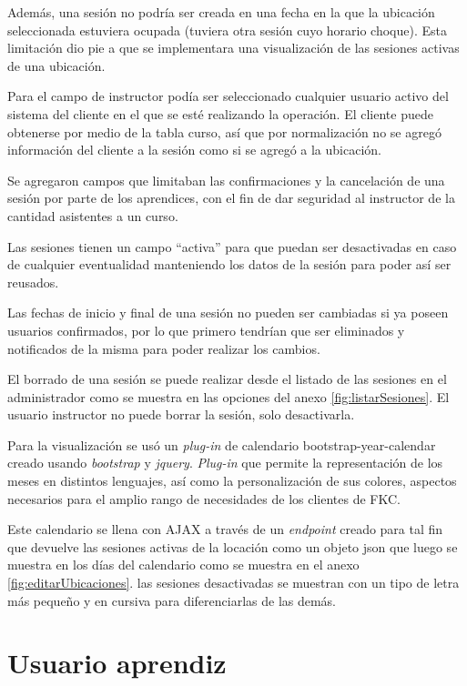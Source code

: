 	Además, una sesión no podría ser creada en una fecha en la que la ubicación seleccionada estuviera ocupada (tuviera otra sesión cuyo horario choque). Esta limitación dio pie a que se implementara una visualización de las sesiones activas de una ubicación.

	Para el campo de instructor podía ser seleccionado cualquier usuario activo del sistema del cliente en el que se esté realizando la operación. El cliente puede obtenerse por medio de la tabla curso, así que por normalización no se agregó información del cliente a la sesión como si se agregó a la ubicación.

	Se agregaron campos que limitaban las confirmaciones y la cancelación de una sesión por parte de los aprendices, con el fin de dar seguridad al instructor de la cantidad asistentes a un curso.

	Las sesiones tienen un campo ``activa'' para que puedan ser desactivadas en caso de cualquier eventualidad manteniendo los datos de la sesión para poder así ser reusados.

	Las fechas de inicio y final de una sesión no pueden ser cambiadas si ya poseen usuarios confirmados, por lo que primero tendrían que ser eliminados y notificados de la misma para poder realizar los cambios.

	El borrado de una sesión se puede realizar desde el listado de las sesiones en el administrador como se muestra en las opciones del anexo \ref{fig:listarSesiones}. El usuario instructor no puede borrar la sesión, solo desactivarla.

	Para la visualización se usó un \emph{plug-in} de calendario bootstrap-year-calendar creado usando \emph{bootstrap} y \emph{jquery}. \emph{Plug-in} que permite la representación de los meses en distintos lenguajes, así como la personalización de sus colores, aspectos necesarios para el amplio rango de necesidades de los clientes de FKC.

	Este calendario se llena con AJAX a través de un \emph{endpoint} creado para tal fin que devuelve las sesiones activas de la locación como un objeto json que luego se muestra en los días del calendario como se muestra en el anexo \ref{fig:editarUbicaciones}. las sesiones desactivadas se muestran con un tipo de letra más pequeño y en cursiva para diferenciarlas de las demás.

	\section{Usuario aprendiz} %
	\label{sec:interfaz_para_el_usuario_aprendiz}
	

